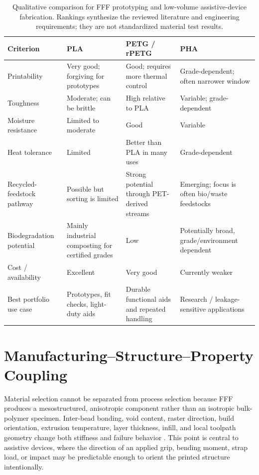 \documentclass[11pt]{article}
\begin{document}
\begin{table}[htbp]
\centering
\small
\caption{Qualitative comparison for FFF prototyping and low-volume assistive-device fabrication. Rankings synthesize the reviewed literature and engineering requirements; they are not standardized material test results.}
\begin{tabularx}{\textwidth}{@{}lYYY@{}}
\toprule
\textbf{Criterion} & \textbf{PLA} & \textbf{PETG / rPETG} & \textbf{PHA} \\
\midrule
Printability & Very good; forgiving for prototypes & Good; requires more thermal control & Grade-dependent; often narrower window \\
Toughness & Moderate; can be brittle & High relative to PLA & Variable; grade-dependent \\
Moisture resistance & Limited to moderate & Good & Variable \\
Heat tolerance & Limited & Better than PLA in many uses & Grade-dependent \\
Recycled-feedstock pathway & Possible but sorting is limited & Strong potential through PET-derived streams & Emerging; focus is often bio/waste feedstocks \\
Biodegradation potential & Mainly industrial composting for certified grades & Low & Potentially broad, grade/environment dependent \\
Cost / availability & Excellent & Very good & Currently weaker \\
Best portfolio use case & Prototypes, fit checks, light-duty aids & Durable functional aids and repeated handling & Research / leakage-sensitive applications \\
\bottomrule
\end{tabularx}
\end{table}

\section{Manufacturing--Structure--Property Coupling}

Material selection cannot be separated from process selection because FFF produces a mesostructured, anisotropic component rather than an isotropic bulk-polymer specimen. Inter-bead bonding, void content, raster direction, build orientation, extrusion temperature, layer thickness, infill, and local toolpath geometry change both stiffness and failure behavior \cite{chacon2017,cojocaru2022}. This point is central to assistive devices, where the direction of an applied grip, bending moment, strap load, or impact may be predictable enough to orient the printed structure intentionally.
\end{document}
